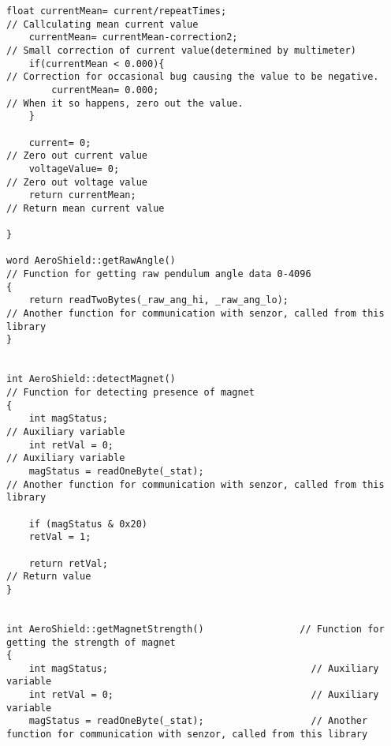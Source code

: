 \begin{lstlisting}[caption={Zdrojový kód súboru AeroShield.cpp.},captionpos=b]
	float currentMean= current/repeatTimes;                                                 // Callculating mean current value 
	currentMean= currentMean-correction2;                                                   // Small correction of current value(determined by multimeter)
	if(currentMean < 0.000){                                                                // Correction for occasional bug causing the value to be negative. 
		currentMean= 0.000;                                                                  // When it so happens, zero out the value. 
	}
	
	current= 0;                                                                              // Zero out current value        
	voltageValue= 0;                                                                         // Zero out voltage value  
	return currentMean;                                                                      // Return mean current value 
	
}

word AeroShield::getRawAngle()                                                             // Function for getting raw pendulum angle data 0-4096
{
	return readTwoBytes(_raw_ang_hi, _raw_ang_lo);                                           // Another function for communication with senzor, called from this library 
}


int AeroShield::detectMagnet()                                                             // Function for detecting presence of magnet 
{
	int magStatus;                                                                           // Auxiliary variable
	int retVal = 0;                                                                          // Auxiliary variable
	magStatus = readOneByte(_stat);                                                          // Another function for communication with senzor, called from this library                         
	
	if (magStatus & 0x20)
	retVal = 1;
	
	return retVal;                                                                           // Return value 
}


int AeroShield::getMagnetStrength()                 // Function for getting the strength of magnet 
{
	int magStatus;                                    // Auxiliary variable
	int retVal = 0;                                   // Auxiliary variable
	magStatus = readOneByte(_stat);                   // Another function for communication with senzor, called from this library     
	

\end{lstlisting}
